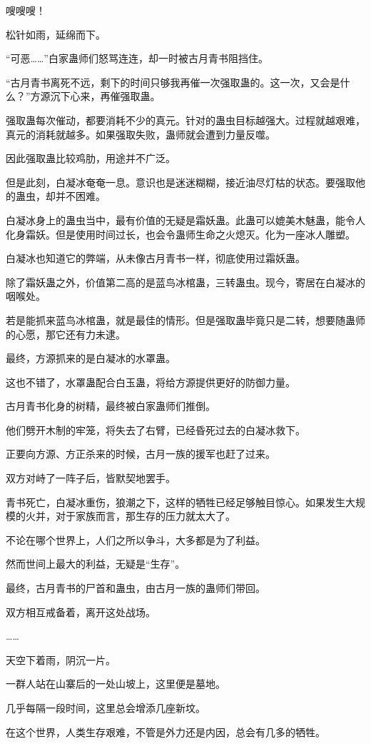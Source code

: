 \begin{this_body}
嗖嗖嗖！

松针如雨，延绵而下。

“可恶……”白家蛊师们怒骂连连，却一时被古月青书阻挡住。

“古月青书离死不远，剩下的时间只够我再催一次强取蛊的。这一次，又会是什么？”方源沉下心来，再催强取蛊。

强取蛊每次催动，都要消耗不少的真元。针对的蛊虫目标越强大。过程就越艰难，真元的消耗就越多。如果强取失败，蛊师就会遭到力量反噬。

因此强取蛊比较鸡肋，用途并不广泛。

但是此刻，白凝冰奄奄一息。意识也是迷迷糊糊，接近油尽灯枯的状态。要强取他的蛊虫，却并不困难。

白凝冰身上的蛊虫当中，最有价值的无疑是霜妖蛊。此蛊可以媲美木魅蛊，能令人化身霜妖。但是使用时间过长，也会令蛊师生命之火熄灭。化为一座冰人雕塑。

白凝冰也知道它的弊端，从未像古月青书一样，彻底使用过霜妖蛊。

除了霜妖蛊之外，价值第二高的是蓝鸟冰棺蛊，三转蛊虫。现今，寄居在白凝冰的咽喉处。

若是能抓来蓝鸟冰棺蛊，就是最佳的情形。但是强取蛊毕竟只是二转，想要随蛊师的心愿，那它还有力未逮。

最终，方源抓来的是白凝冰的水罩蛊。

这也不错了，水罩蛊配合白玉蛊，将给方源提供更好的防御力量。

古月青书化身的树精，最终被白家蛊师们推倒。

他们劈开木制的牢笼，将失去了右臂，已经昏死过去的白凝冰救下。

正要向方源、方正杀来的时候，古月一族的援军也赶了过来。

双方对峙了一阵子后，皆默契地罢手。

青书死亡，白凝冰重伤，狼潮之下，这样的牺牲已经足够触目惊心。如果发生大规模的火并，对于家族而言，那生存的压力就太大了。

不论在哪个世界上，人们之所以争斗，大多都是为了利益。

然而世间上最大的利益，无疑是“生存”。

最终，古月青书的尸首和蛊虫，由古月一族的蛊师们带回。

双方相互戒备着，离开这处战场。

……

天空下着雨，阴沉一片。

一群人站在山寨后的一处山坡上，这里便是墓地。

几乎每隔一段时间，这里总会增添几座新坟。

在这个世界，人类生存艰难，不管是外力还是内因，总会有几多的牺牲。


\end{this_body}
